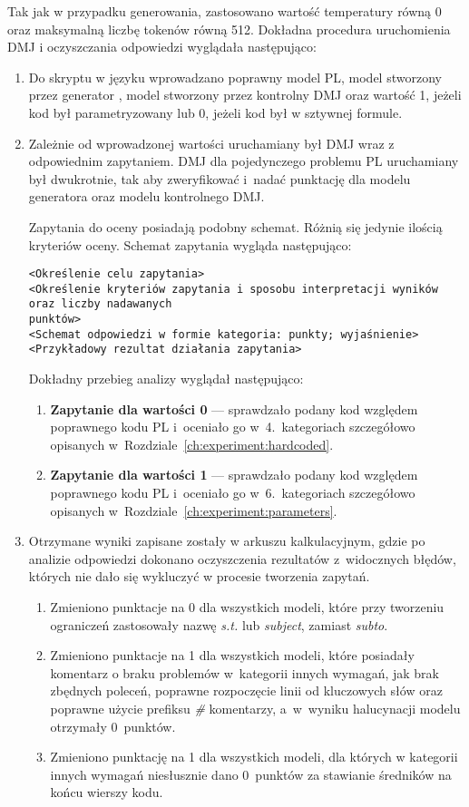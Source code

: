 Tak jak w przypadku generowania, zastosowano wartość temperatury równą 0 oraz maksymalną liczbę tokenów równą 512. Dokładna procedura uruchomienia DMJ i oczyszczania odpowiedzi wyglądała następująco:

\begin{enumerate}
\item Do skryptu w języku  wprowadzano poprawny model PL, model stworzony przez generator , model stworzony przez kontrolny DMJ oraz wartość 1, jeżeli kod był parametryzowany lub 0, jeżeli kod był w sztywnej formule.
\item Zależnie od wprowadzonej wartości uruchamiany był DMJ wraz z odpowiednim zapytaniem. DMJ dla pojedynczego problemu PL uruchamiany był dwukrotnie, tak aby zweryfikować i~nadać punktację dla modelu generatora oraz modelu kontrolnego DMJ.

Zapytania do oceny posiadają podobny schemat. Różnią się jedynie ilością kryteriów oceny. Schemat zapytania wygląda następująco:

\begin{lstlisting}[language=zimpl]
<Określenie celu zapytania>
<Określenie kryteriów zapytania i sposobu interpretacji wyników oraz liczby nadawanych
punktów>
<Schemat odpowiedzi w formie kategoria: punkty; wyjaśnienie>
<Przykładowy rezultat działania zapytania>
\end{lstlisting}

Dokładny przebieg analizy wyglądał następująco:

\begin{enumerate}
\item \textbf{Zapytanie dla wartości 0} --- sprawdzało podany kod względem poprawnego kodu PL i~oceniało go w~4.~kategoriach szczegółowo opisanych w~Rozdziale~\ref{ch:experiment:hardcoded}.
\item \textbf{Zapytanie dla wartości 1} --- sprawdzało podany kod względem poprawnego kodu PL i~oceniało go w~6.~kategoriach szczegółowo opisanych w~Rozdziale~\ref{ch:experiment:parameters}.
\end{enumerate}
\item Otrzymane wyniki zapisane zostały w arkuszu kalkulacyjnym, gdzie po analizie odpowiedzi dokonano oczyszczenia rezultatów z~widocznych błędów, których nie dało się wykluczyć w procesie tworzenia zapytań.
\begin{enumerate}
\item Zmieniono punktacje na 0 dla wszystkich modeli, które przy tworzeniu ograniczeń zastosowały nazwę \textit{s.t.} lub \textit{subject}, zamiast \textit{subto}.
\item Zmieniono punktacje na 1 dla wszystkich modeli, które posiadały komentarz o braku problemów w~kategorii innych wymagań, jak brak zbędnych poleceń, poprawne rozpoczęcie linii od kluczowych słów oraz poprawne użycie prefiksu \textit{\#} komentarzy, a~w~wyniku halucynacji modelu otrzymały 0~punktów.
\item Zmieniono punktację na 1 dla wszystkich modeli, dla których w kategorii innych wymagań niesłusznie dano 0~punktów za stawianie średników na końcu wierszy kodu.
\end{enumerate}
\end{enumerate}

